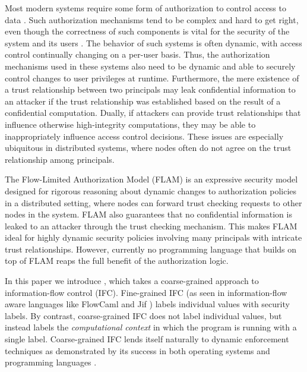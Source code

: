 Most modern systems require some form of authorization to control access to data \cite{Menezes:1996:HAC:548089}. Such authorization mechanisms tend to be complex and hard to get right, even though the correctness of such components is vital for the security of the system and its users \cite{Ferraiolo:1999:RAC:300830.300834}. 
The behavior of such systems is often dynamic, with access control continually changing on a per-user basis. Thus, the authorization mechanisms used in these systems also need to be dynamic and able to securely control changes to user privileges \cite{Ferraiolo:1999:RAC:300830.300834} at runtime. Furthermore, the mere existence of a trust relationship between two principals may leak confidential information to an attacker if the trust relationship was established based on the result of a confidential computation. Dually, if attackers can provide trust relationships that influence otherwise high-integrity computations, they may be able to inappropriately influence access control decisions. These issues are especially ubiquitous in distributed systems, where nodes often do not agree on the trust relationship among principals.

The Flow-Limited Authorization Model (FLAM) \cite{Arden:2015:FA:2859845.2859998} is an expressive security model designed for rigorous reasoning about dynamic changes to authorization policies in a distributed setting, where nodes can forward trust checking requests to other nodes in the system. FLAM also guarantees that no confidential information is leaked to an attacker through the trust checking mechanism. This makes FLAM ideal for highly dynamic security policies involving many principals with intricate trust relationships. However, currently no programming language that builds on top of FLAM reaps the full benefit of the authorization logic.

In this paper we introduce \lang{}, which takes a coarse-grained approach to information-flow control (IFC). Fine-grained IFC (as seen in information-flow aware languages like FlowCaml \cite{Pottier:2003:IFI:596980.596983} and Jif \cite{Myers:1999:JPM:292540.292561}) labels individual values with security labels. By contrast, coarse-grained IFC does not label individual values, but instead labels the \emph{computational context} in which the program is running with a single label. Coarse-grained IFC lends itself naturally to dynamic enforcement techniques as demonstrated by its success in both operating systems \cite{Zeldovich:2006:MIF:1267308.1267327, Zeldovich:2008:SDS:1387589.1387610, Efstathopoulos:2005:LEP:1095810.1095813, Krohn:2007:IFC:1294261.1294293} and programming languages \cite{SRMMlio, Buiras:2015:HMS:2784731.2784758, Stefan:2012:ACT:2364527.2364557, Buiras:2015:DED:2786558.2786563}.

